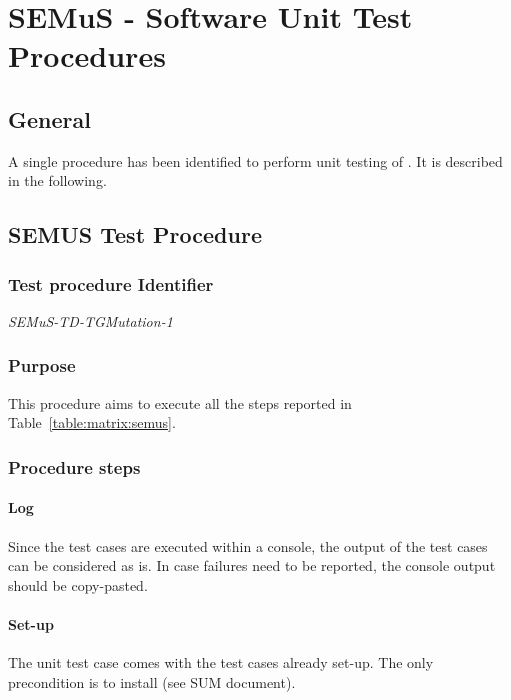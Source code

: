 
\chapter{SEMuS - Software Unit Test Procedures}

\section{General}

A single procedure has been identified to perform unit testing of \SEMUS. It is described in the following.

\section{SEMUS Test Procedure}

\subsection{Test procedure Identifier}

\emph{SEMuS-TD-TGMutation-1}


\subsection{Purpose}

This procedure aims to execute all the steps reported in Table~\ref{table:matrix:semus}.

\subsection{Procedure steps}

\subsubsection{Log}
Since the test cases are executed within a console, the output of the test cases can be considered as is.
In case failures need to be reported, the console output should be copy-pasted.
\subsubsection{Set-up}
The unit test case comes with the test cases already set-up. The only precondition is to install \SEMUS (see SUM document).
